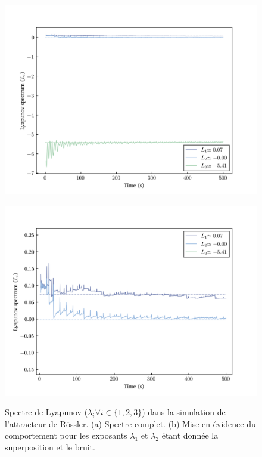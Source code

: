     \begin{figure}[h!]
        \centering
        \begin{minipage}{0.49\textwidth}
          \centering
          \includegraphics[scale = 0.4]{figs/lyapunovs/lyap_rossler.png}
          \subcaption{}
          \label{fig: lyap_rossler}
        \end{minipage}
        \begin{minipage}{0.49\textwidth}
          \centering
          \includegraphics[scale = 0.4]{figs/lyapunovs/lyap_rossler_zoom.png}
          \subcaption{}
          \label{fig: lyap_rossler_zoom}
        \end{minipage}
        \caption{Spectre de Lyapunov ($\lambda_i\forall i\in\{1, 2, 3\}$) dans la simulation de l'attracteur de Rössler. (a) Spectre complet. (b) Mise en évidence du comportement pour les exposants $\lambda_1$ et $\lambda_2$ étant donnée la superposition et le bruit.}
        \label{fig : lyaps_rossler}
    \end{figure}

